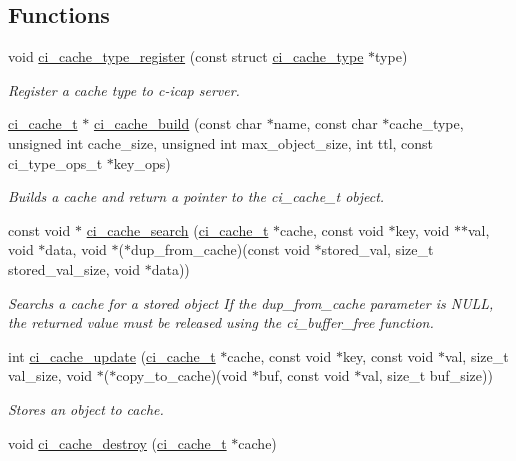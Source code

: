 \subsection*{Functions}
\begin{DoxyCompactItemize}
\item 
\hypertarget{group__CACHE_gad4dbee8097b9108838f4ba32603468d0}{
void \hyperlink{group__CACHE_gad4dbee8097b9108838f4ba32603468d0}{ci\_\-cache\_\-type\_\-register} (const struct \hyperlink{structci__cache__type}{ci\_\-cache\_\-type} $\ast$type)}
\label{group__CACHE_gad4dbee8097b9108838f4ba32603468d0}

\begin{DoxyCompactList}\small\item\em Register a cache type to c-\/icap server. \item\end{DoxyCompactList}\item 
\hyperlink{structci__cache}{ci\_\-cache\_\-t} $\ast$ \hyperlink{group__CACHE_gab763186f35fc485777a5316bb5eb77fe}{ci\_\-cache\_\-build} (const char $\ast$name, const char $\ast$cache\_\-type, unsigned int cache\_\-size, unsigned int max\_\-object\_\-size, int ttl, const ci\_\-type\_\-ops\_\-t $\ast$key\_\-ops)
\begin{DoxyCompactList}\small\item\em Builds a cache and return a pointer to the ci\_\-cache\_\-t object. \item\end{DoxyCompactList}\item 
const void $\ast$ \hyperlink{group__CACHE_gaf9206185729dcf6b3df57d49fea7262d}{ci\_\-cache\_\-search} (\hyperlink{structci__cache}{ci\_\-cache\_\-t} $\ast$cache, const void $\ast$key, void $\ast$$\ast$val, void $\ast$data, void $\ast$($\ast$dup\_\-from\_\-cache)(const void $\ast$stored\_\-val, size\_\-t stored\_\-val\_\-size, void $\ast$data))
\begin{DoxyCompactList}\small\item\em Searchs a cache for a stored object If the dup\_\-from\_\-cache parameter is NULL, the returned value must be released using the ci\_\-buffer\_\-free function. \item\end{DoxyCompactList}\item 
int \hyperlink{group__CACHE_ga5444f3840260228614820cbd2ed11dc3}{ci\_\-cache\_\-update} (\hyperlink{structci__cache}{ci\_\-cache\_\-t} $\ast$cache, const void $\ast$key, const void $\ast$val, size\_\-t val\_\-size, void $\ast$($\ast$copy\_\-to\_\-cache)(void $\ast$buf, const void $\ast$val, size\_\-t buf\_\-size))
\begin{DoxyCompactList}\small\item\em Stores an object to cache. \item\end{DoxyCompactList}\item 
\hypertarget{group__CACHE_ga46f70ed1ea4dd861f95c45066bda4922}{
void \hyperlink{group__CACHE_ga46f70ed1ea4dd861f95c45066bda4922}{ci\_\-cache\_\-destroy} (\hyperlink{structci__cache}{ci\_\-cache\_\-t} $\ast$cache)}
\label{group__CACHE_ga46f70ed1ea4dd861f95c45066bda4922}


\end{DoxyCompactItemize}
